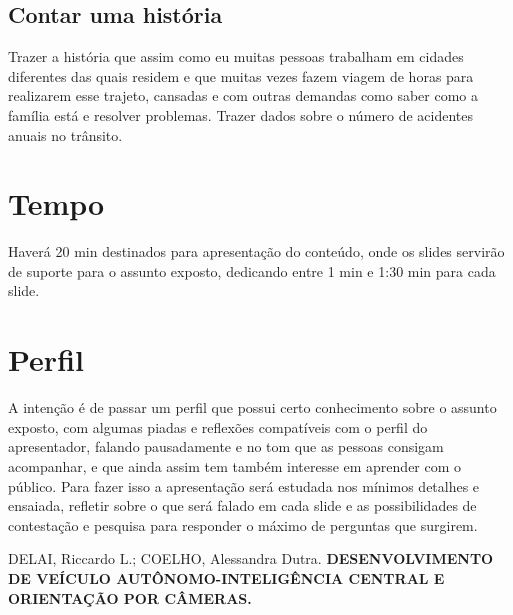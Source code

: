 \documentclass[12pt,a4paper]{article}
\begin{document}
    \subsection{Contar uma história}
    \par Trazer a história que assim como eu muitas pessoas trabalham em cidades diferentes das quais residem e que muitas vezes fazem viagem de horas para realizarem esse trajeto, cansadas e com outras demandas como saber como a família está e resolver problemas. Trazer dados sobre o número de acidentes anuais no trânsito.
    \section{Tempo}
    \par Haverá 20 min destinados para apresentação do conteúdo, onde os slides servirão de suporte para o assunto exposto, dedicando entre 1 min e 1:30 min para cada slide.  
    
    \section{Perfil}
    \par A intenção é de passar um perfil que possui certo conhecimento sobre o assunto exposto, com algumas piadas e reflexões compatíveis com o perfil do apresentador, falando pausadamente e no tom que as pessoas consigam acompanhar, e que ainda assim tem também interesse em aprender com o público. Para fazer isso a apresentação será estudada nos mínimos detalhes e ensaiada, refletir sobre o que será falado em cada slide e as possibilidades de contestação e pesquisa para responder o máximo de perguntas que surgirem.


     
    \begin{thebibliography}{BIBLIOGRAFIA}
 
         DELAI, Riccardo L.; COELHO, Alessandra Dutra. \textbf{DESENVOLVIMENTO DE VEÍCULO AUTÔNOMO-INTELIGÊNCIA CENTRAL E ORIENTAÇÃO POR CÂMERAS.}
    
    \end{thebibliography}
\end{document}
